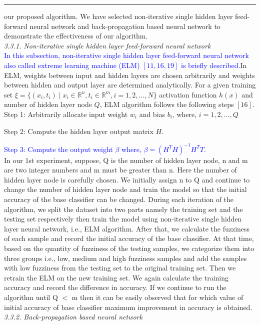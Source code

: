 \documentclass{article}
\begin{document}
		\hrule
		\vspace{1em}
		our proposed algorithm. We have selected non-iterative single hidden layer feed-forward neural network and
		\newpage
		back-propagation based neural network to demonstrate the effectiveness of our algorithm.\\[15pt]
		\textit{3.3.1. Non-iterative single hidden layer feed-forward neural network}\\
		
		\textcolor{blue}{In this subsection, non-iterative single hidden layer feed-forward neural network also called extreme learning machine (ELM) $[11, 16, 19]$ is briefly described.}In ELM, weights between input and hidden layers are chosen arbitrarily and weights between hidden and output layer are determined analytically. For a given training set $\xi = \{(x_i, t_i) \mid x_i \in \mathbb{R}^n, t_i \in \mathbb{R}^m, i = 1, 2, \ldots, N\}$ activation function $h(x)$ and number of hidden layer node $Q$, ELM algorithm follows the following steps $[16]$.\\
		
		Step 1: Arbitrarily allocate input weight $w_i$ and bias $b_i$, where, $i = 1, 2, \ldots, Q$ 
		
		Step 2: Compute the hidden layer output matrix $H$.
		
		\textcolor{blue}{Step 3: Compute the output weight $\beta$ where, $\beta = (H^T H)^{-1} H^T T$.} \\
		
		In our 1st experiment, suppose, Q is the number of hidden layer node, n and m are two integer numbers and m must be greater than n. Here the number of hidden layer node is carefully chosen. We initially assign n to Q and continue to change the number of hidden layer node and train the model so that the initial accuracy of the base classifier can be changed. During each iteration of the algorithm, we split the dataset into two parts namely the training set and the testing set respectively then train the model using non-iterative single hidden layer neural network, i.e., ELM algorithm. After that, we calculate the fuzziness of each sample and record the initial accuracy of the base classifier. At that time, based on the quantity of fuzziness of the testing samples, we categorize them into three groups i.e., low, medium and high fuzziness samples and add the samples with low fuzziness from the testing set to the original training set. Then we retrain the ELM on the new training set. We again calculate the training accuracy and record the difference in accuracy. If we continue to run the algorithm until Q $<$ m then it can be easily observed that for which value of initial accuracy of base classifier maximum improvement in accuracy is obtained.\\[15pt]
		\textit{3.3.2. Back-propagation based neural network}\\
		
\end{document}
